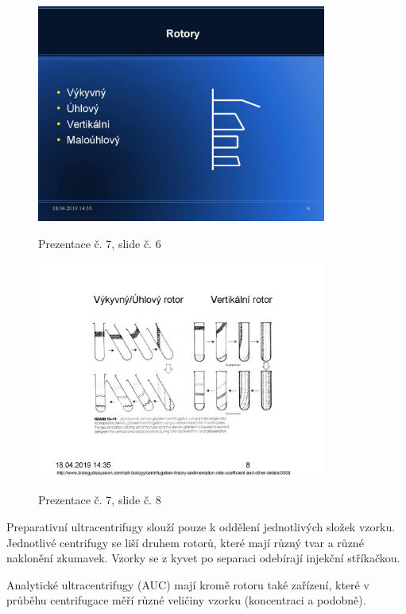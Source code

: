\documentclass[DIV=8]{scrreprt}
\begin{document}
\begin{figure}
    \caption{Prezentace č. 7, slide č. 6}
    \includegraphics[width=0.85\textwidth]{slides-7/slide-6.jpg}
    \centering
    \label{slides-7-slide-6}
\end{figure}
\begin{figure}
    \caption{Prezentace č. 7, slide č. 8}
    \includegraphics[width=0.85\textwidth]{slides-7/slide-8.jpg}
    \centering
    \label{slides-7-slide-8}
\end{figure}

Preparativní ultracentrifugy slouží pouze k oddělení jednotlivých složek vzorku. Jednotlivé centrifugy se liší druhem rotorů, které mají různý tvar a různé naklonění zkumavek. Vzorky se z kyvet po separaci odebírají injekční stříkačkou.

Analytické ultracentrifugy (AUC) mají kromě rotoru také zařízení, které v průběhu centrifugace měří různé veličiny vzorku (koncentraci a podobně).
\end{document}
